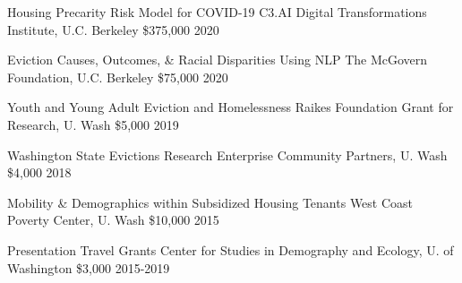 



\begin{cvhonors}

  \cvhonor
    {Housing Precarity Risk Model for COVID-19} %
    {C3.AI Digital Transformations Institute, U.C. Berkeley} %
    {\$375,000} %
    {2020} %

  \cvhonor
    {Eviction Causes, Outcomes, \& Racial Disparities Using NLP} %
    {The McGovern Foundation, U.C. Berkeley} %
    {\$75,000} %
    {2020} %

  \cvhonor
    {Youth and Young Adult Eviction and Homelessness} %
    {Raikes Foundation Grant for Research, U. Wash} %
    {\$5,000} %
    {2019} %

  \cvhonor
    {Washington State Evictions Research} %
    {Enterprise Community Partners, U. Wash} %
    {\$4,000} %
    {2018} %

   \cvhonor
    {Mobility \& Demographics within Subsidized Housing Tenants} %
    {West Coast Poverty Center, U. Wash} %
    {\$10,000} %
    {2015} %
    
  \cvhonor
    {Presentation Travel Grants} %
    {Center for Studies in Demography and Ecology, U. of Washington} %
    {\$3,000} %
    {2015-2019} %


\end{cvhonors}


